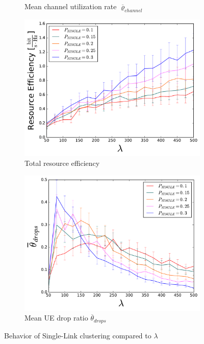 \begin{figure}[H]
\begin{subfigure}[b]{0.5\linewidth}
    \caption{Mean channel utilization rate $\overline{\varrho}_{channel}$} 
    \label{fig:SINGLELINES_8} 
    \vspace{4ex}
  \end{subfigure} 
  \begin{subfigure}[b]{0.5\linewidth}
    \centering
    \captionsetup{justification=centering}
    \includegraphics[width=1\linewidth]{figures/SINGLELINES_9} 
    \caption{Total resource efficiency} 
    \label{fig:SINGLELINES_9} 
  \end{subfigure}%
  \begin{subfigure}[b]{0.5\linewidth}
    \centering
    \captionsetup{justification=centering}
    \includegraphics[width=1\linewidth]{figures/SINGLELINES_10} 
    \caption{Mean UE drop ratio $\overline{\theta}_{drops}$} 
    \label{fig:SINGLELINES_10} 
  \end{subfigure} 
  \caption{Behavior of Single-Link clustering compared to $\lambda$}
  \label{fig:pretty_results_SINGLE} 
\end{figure}

